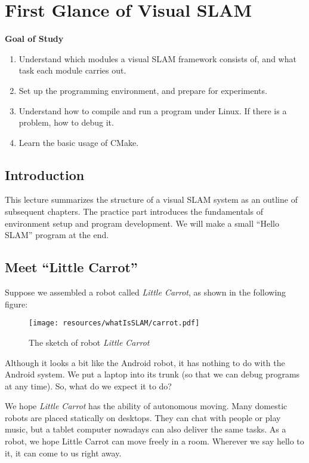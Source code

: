 \chapter{First Glance of Visual SLAM}
\begin{mdframed}
	\textbf{Goal of Study}
	\begin{enumerate}[labelindent=0em,leftmargin=1.5em]
		\item Understand which modules a visual SLAM framework consists of, and what task each module carries out.
		\item Set up the programming environment, and prepare for experiments.
		\item Understand how to compile and run a program under Linux. If there is a problem, how to debug it.
		\item Learn the basic usage of CMake.
	\end{enumerate}
\end{mdframed}

\newpage
\section{Introduction}

This lecture summarizes the structure of a visual SLAM system as an outline of subsequent chapters. The practice part introduces the fundamentals of environment setup and program development. We will make a small ``Hello SLAM'' program at the end.
\newpage

\newpage

\section{Meet ``Little Carrot''}

Suppose we assembled a robot called \emph{Little Carrot}, as shown in the following figure:

\begin{figure}
	\centering
	\texttt{[image: resources/whatIsSLAM/carrot.pdf]}
	\caption{The sketch of robot \emph{Little Carrot}}
\end{figure}

Although it looks a bit like the Android robot, it has nothing to do with the Android system. We put a laptop into its trunk (so that we can debug programs at any time). So, what do we expect it to do? 

We hope \textit{Little Carrot} has the ability of autonomous moving. Many domestic robots are placed statically on desktops. They can chat with people or play music, but a tablet computer nowadays can also deliver the same tasks. As a robot, we hope Little Carrot can move freely in a room. Wherever we say hello to it, it can come to us right away.

